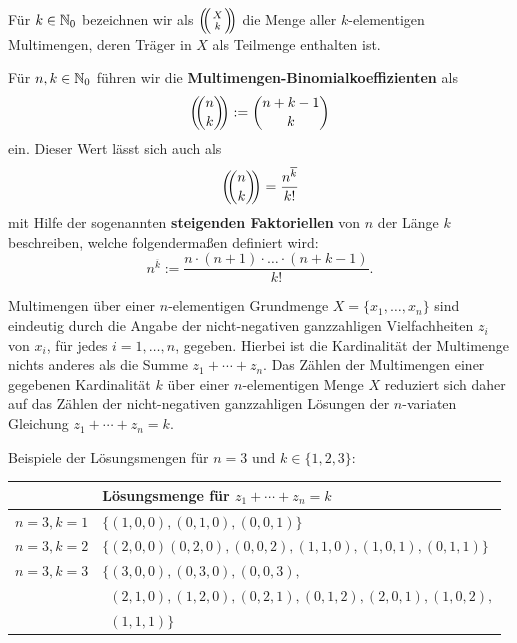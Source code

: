 \begin{defn}
	Für $k \in \mathbb{N}_0$ bezeichnen wir als $\multiset{X}{k}$ die Menge aller $k$-elementigen Multimengen, deren Träger in  $X$ als Teilmenge enthalten ist. 
\end{defn} 

\begin{defn}
		Für $n,k \in \mathbb{N}_0$ führen wir die \textbf{Multimengen-Binomialkoeffizienten} als 
		\[
			\left(\!\!\binom{n}{k}\!\!\right) := \binom{n+k-1}{k}
		\] ein. Dieser Wert lässt sich auch als 
		\[
			\left(\!\!\binom{n}{k}\!\!\right) =\frac{ n^{\overline{k}}}{k!}
		\]
		mit Hilfe der sogenannten \textbf{steigenden Faktoriellen} von $n$ der Länge $k$ beschreiben, welche folgendermaßen definiert wird: 
		\[
				n^{\overline{k}} := \frac{n \cdot (n+1) \cdot \ldots \cdot (n+k-1)}{k!}.
		\]
\end{defn} 

\begin{bem}
 	Multimengen über einer $n$-elementigen Grundmenge $X = \{x_1,\ldots,x_n\}$ sind eindeutig durch die Angabe der nicht-negativen ganzzahligen Vielfachheiten $z_i$ von $x_i$, für jedes $i=1,\ldots,n$, gegeben. Hierbei ist die Kardinalität der Multimenge nichts anderes als die Summe $z_1 + \cdots + z_n$. Das Zählen der Multimengen einer gegebenen Kardinalität $k$ über einer $n$-elementigen Menge $X$ reduziert sich daher auf das Zählen der nicht-negativen ganzzahligen Lösungen der $n$-variaten Gleichung $z_1 + \cdots + z_n = k$. 
 	
 	Beispiele der Lösungsmengen für $n=3$ und $k \in \{1,2,3\}$: 
 	\begin{center} 
 	\begin{tabular}{l|l}
 			& Lösungsmenge für $z_1 + \cdots + z_n =k$ 
 			\\ \hline 
 		$n=3, k=1$ & $\{(1,0,0), (0,1,0), (0,0,1)\}$ 
 		\\ $n=3, k=2$ & $\{(2,0,0)(0,2,0),(0,0,2), (1,1,0),(1,0,1), (0,1,1)\}$
 		\\ $n=3, k=3$ & $\{(3,0,0),(0,3,0),(0,0,3),$
 		\\ & $\phantom{\{}(2,1,0),(1,2,0),(0,2,1),(0,1,2),(2,0,1),(1,0,2),$
 		\\ & $\phantom{\{} (1,1,1)\}$
 	\end{tabular} 
 	\end{center} 
\end{bem} 

